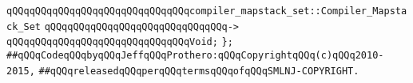 \verb|qQQqqQQqqQQqqQQqqQQqqQQqqQQqqQQqcompiler_mapstack_set::Compiler_Mapstack_Set|\newline
\verb|qQQqqQQqqQQqqQQqqQQqqQQqqQQqqQQq->|\newline
\verb|qQQqqQQqqQQqqQQqqQQqqQQqqQQqqQQqVoid;|\newline
\newline
\verb|};|\newline
\newline
\newline
\verb|##qQQqCodeqQQqbyqQQqJeffqQQqProthero:qQQqCopyrightqQQq(c)qQQq2010-2015,|\newline
\verb|##qQQqreleasedqQQqperqQQqtermsqQQqofqQQqSMLNJ-COPYRIGHT.|\newline

